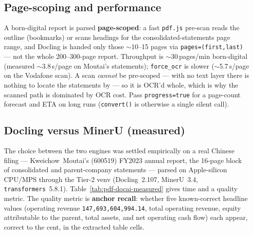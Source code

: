 \documentclass[11pt,a4paper]{report}
\begin{document}
\begin{subappendices}
\subsection{Page-scoping and performance}
A born-digital report is parsed \textbf{page-scoped}: a fast \texttt{pdf.js} pre-scan reads the outline
(bookmarks) or scans headings for the consolidated-statements page range, and Docling is handed only those
\(\sim\)10--15 pages via \texttt{pages=(first,last)} --- not the whole 200--300-page report. Throughput is
\(\sim\)30\,pages/min born-digital (measured \(\sim\)3.8\,s/page on Moutai's statements); \texttt{force\_ocr}
is slower (\(\sim\)5.7\,s/page on the Vodafone scan). A scan \emph{cannot} be pre-scoped --- with no text
layer there is nothing to locate the statements by --- so it is OCR'd whole, which is why the scanned path is
dominated by OCR cost. Pass \texttt{progress=true} for a page-count forecast and ETA on long runs
(\texttt{convert()} is otherwise a single silent call).

\subsection{Docling versus MinerU (measured)}
\label{sec:pdf-docai-measured}

The choice between the two engines was settled empirically on a real Chinese filing --- Kweichow~Moutai's
(600519) FY2023 annual report, the 16-page block of consolidated and parent-company statements --- parsed on
Apple-silicon CPU/MPS through the Tier-2 venv (Docling~2.107, MinerU~3.4, \texttt{transformers}~5.8.1).
Table~\ref{tab:pdf-docai-measured} gives time and a quality metric. The quality metric is \textbf{anchor
recall}: whether five known-correct headline values (operating revenue \texttt{147{,}693{,}604{,}994.14},
total operating revenue, equity attributable to the parent, total assets, and net operating cash flow) each
appear, correct to the cent, in the extracted table cells.


\end{subappendices}
\end{document}
